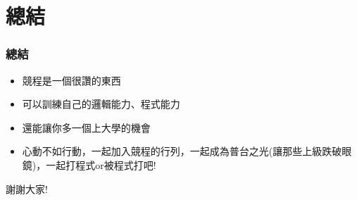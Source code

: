 \documentclass[mathserif]{beamer}
\begin{document}
        \section{總結}
    
    \begin{frame}
        \frametitle{總結}
        \begin{itemize}
            \item 競程是一個很讚的東西
            \pause
            \item 可以訓練自己的邏輯能力、程式能力
            \pause
            \item 還能讓你多一個上大學的機會
            \pause
            \item 心動不如行動，一起加入競程的行列，一起成為普台之光(讓那些上級跌破眼鏡)，一起打程式or被程式打吧!
        \end{itemize}
    \end{frame}

    \begin{frame}
        \begin{center}
            謝謝大家!
        \end{center}
    \end{frame}
\end{document}
